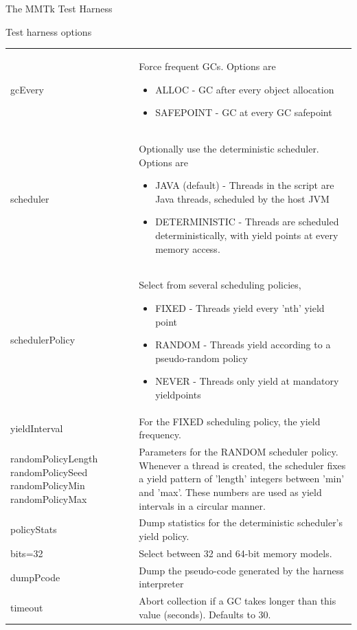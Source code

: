 \begin{section}{The MMTk Test Harness}
\begin{subsection}{Test harness options}
\begin{center}
\begin{longtable}{p{}p{}}
gcEvery & Force frequent GCs.  Options are
\begin{itemize}
  \item ALLOC - GC after every object allocation 
  \item SAFEPOINT - GC at every GC safepoint
\end{itemize} \\
scheduler & Optionally use the deterministic scheduler.  Options are
\begin{itemize}
  \item JAVA (default) - Threads in the script are Java threads, scheduled by the host JVM
  \item DETERMINISTIC - Threads are scheduled deterministically, with yield points at every memory access.
\end{itemize} \\
schedulerPolicy & Select from several scheduling policies,
\begin{itemize}
  \item FIXED - Threads yield every 'nth' yield point
  \item RANDOM - Threads yield according to a pseudo-random policy
  \item NEVER - Threads only yield at mandatory yieldpoints
\end{itemize} \\
yieldInterval & For the FIXED scheduling policy, the yield frequency. \\
randomPolicyLength \newline randomPolicySeed \newline randomPolicyMin \newline randomPolicyMax & Parameters for the RANDOM scheduler policy.  Whenever a thread is created, the scheduler fixes a yield pattern of 'length' integers between 'min' and 'max'.  These numbers are used as yield intervals in a circular manner. \\
policyStats & Dump statistics for the deterministic scheduler's yield policy. \\
bits=32\textbar 64 & Select between 32 and 64-bit memory models. \\
dumpPcode & Dump the pseudo-code generated by the harness interpreter \\
timeout & Abort collection if a GC takes longer than this value (seconds).  Defaults to 30. \\
\end{longtable}
\end{center}


\end{subsection}
\end{section}
